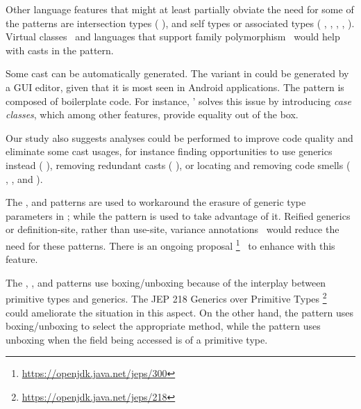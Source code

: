 Other language features that might at least partially obviate the need for some of the patterns are
intersection types (\cf{} ),
and self types or associated types (\cf{} 
,
,
,
,
).
Virtual classes~\citep{gbeta, scalaIndependentlyExtensible} and languages that support family polymorphism~\citep{ernstFamilyPolymorphism2001}
would help with casts in the  pattern.

Some cast can be automatically generated.
The  variant in  could be generated by a GUI editor,
given that it is most seen in Android applications.
The  pattern is composed of boilerplate code.
For instance, \scala{}' solves this issue by introducing \emph{case classes},
which among other features, provide equality out of the box.

Our study also suggests analyses could be performed to improve code quality and eliminate some cast usages,
for instance finding opportunities to use generics instead (\cf{} ),
removing redundant casts (\cf{} ),
or locating and removing code smells (\cf{}
,
, and
).

The
,
 and
patterns are used to workaround the erasure of generic type parameters in \java{};
while the  pattern is used to take advantage of it.
Reified generics or definition-site, rather than use-site,
variance annotations~\citep{altidorTamingWildcardsCombining2011}
would reduce the need for these patterns.
There is an ongoing proposal%
\footnote{\url{https://openjdk.java.net/jeps/300}}~\citep{jep300}
to enhance \java{} with this feature.

The
,
, and
patterns use boxing/unboxing because of the interplay between primitive types and generics.
The JEP 218 Generics over Primitive Types%
\footnote{\url{https://openjdk.java.net/jeps/218}}~\citep{jep218}
could ameliorate the situation in this aspect.
On the other hand, 
the  pattern uses boxing/unboxing to select the appropriate method,
while the  pattern
uses unboxing when the field being accessed is of a primitive type.

